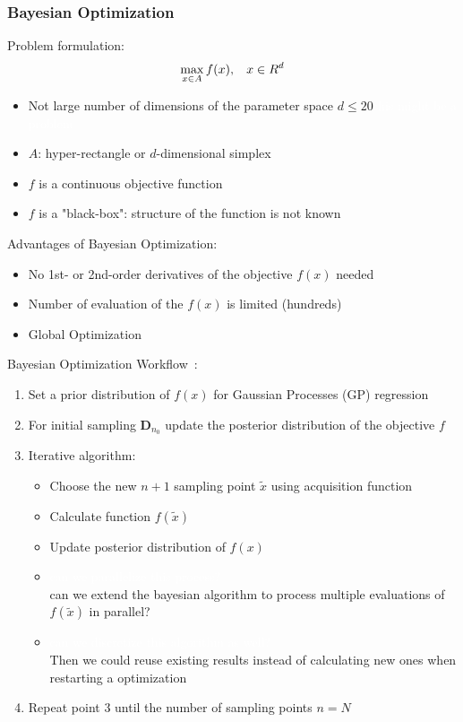 \documentclass{article}
\newcommand{\todo}[1]{\colorbox{WildStrawberry}{\textcolor{white}{#1}}}
\begin{document}
\subsubsection*{Bayesian Optimization}
Problem formulation:
\begin{equation*}
    \max_{x \in A} f(x), \hspace{3mm} x \in R^d
\end{equation*}

\begin{itemize}
    \item Not large number of dimensions of the parameter space $d \leq 20$\todo{this might be a
        problem}
    \item $A$: hyper-rectangle or $d$-dimensional simplex
    \item $f$ is a continuous objective function
    \item $f$ is a "black-box": structure of the function is not known
\end{itemize}

Advantages of Bayesian Optimization:

\begin{itemize}
    \item No 1st- or 2nd-order derivatives of the objective $f(x)$ needed
    \item Number of evaluation of the $f(x)$ is limited (hundreds)
    \item Global Optimization
\end{itemize}

Bayesian Optimization Workflow~\cite{frazier_tutorial_2018}:
\begin{enumerate}
    \item Set a prior distribution of $f(x)$ for Gaussian Processes (GP) regression
    \item For initial sampling $\mathbf{D}_{n_0}$ update the posterior distribution of the objective $f$
    \item Iterative algorithm:
    \begin{itemize}
        \item Choose the new $n+1$ sampling point $\tilde x$ using acquisition function
        \item Calculate function $f(\tilde x)$
        \item Update posterior distribution of $f(x)$
        \item \todo{can we parallelize this process?}\\
            can we extend the bayesian algorithm to process
            multiple evaluations of $f(\tilde x)$ in parallel?
        \item \todo{can we discretize this algorithm as well?}\\
            Then we could reuse existing results instead of calculating new ones when restarting a
            optimization
    \end{itemize}
    \item Repeat point 3 until the number of sampling points $n=N$
\end{enumerate}
\end{document}
